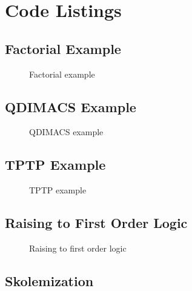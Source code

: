 \chapter{Code Listings} \label{codelistings}

\section{Factorial Example}

\begin{figure}[H]
\caption{Factorial example}
\begin{CenteredBox}

\end{CenteredBox}
\end{figure}

\section{QDIMACS Example}

\begin{figure}[H]
\caption{QDIMACS example}
\begin{CenteredBox}

\end{CenteredBox}
\end{figure}

\section{TPTP Example}

\begin{figure}[H]
\caption{TPTP example}
\begin{CenteredBox}

\end{CenteredBox}
\end{figure}

\section{Raising to First Order Logic}

\begin{figure}[H]
\caption{Raising to first order logic}
\begin{CenteredBox}

\end{CenteredBox}
\end{figure}

\section{Skolemization}

